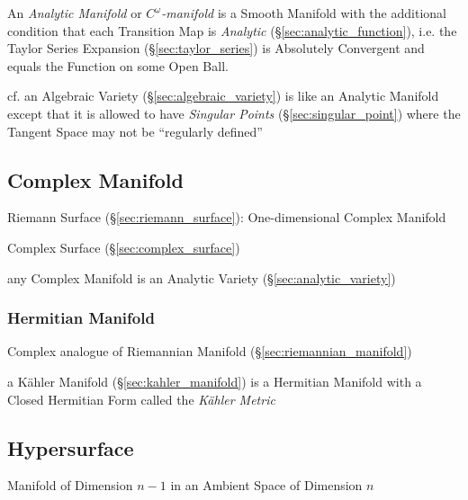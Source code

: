An \emph{Analytic Manifold} or \emph{$C^\omega$-manifold} is a Smooth Manifold
with the additional condition that each Transition Map is \emph{Analytic}
(\S\ref{sec:analytic_function}), i.e. the Taylor Series Expansion
(\S\ref{sec:taylor_series}) is Absolutely Convergent and equals the Function on
some Open Ball.

cf. an Algebraic Variety (\S\ref{sec:algebraic_variety}) is like an Analytic
Manifold except that it is allowed to have \emph{Singular Points}
(\S\ref{sec:singular_point}) where the Tangent Space may not be ``regularly
defined''



\subsection{Complex Manifold}\label{sec:complex_manifold}

Riemann Surface (\S\ref{sec:riemann_surface}): One-dimensional Complex
Manifold


Complex Surface (\S\ref{sec:complex_surface})

any Complex Manifold is an Analytic Variety (\S\ref{sec:analytic_variety})



\subsubsection{Hermitian Manifold}\label{sec:hermitian_manifold}

Complex analogue of Riemannian Manifold (\S\ref{sec:riemannian_manifold})

a K\"ahler Manifold (\S\ref{sec:kahler_manifold}) is a Hermitian
Manifold with a Closed Hermitian Form called the \emph{K\"ahler
  Metric} %



\subsection{Hypersurface}\label{sec:hypersurface}


Manifold of Dimension $n-1$ in an Ambient Space of Dimension $n$

